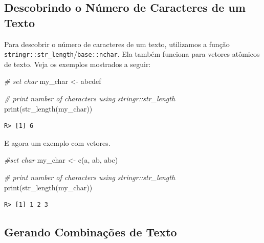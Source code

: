 \documentclass[
  11pt,
]{book}
\newenvironment{Shaded}{\begin{snugshade}}{\end{snugshade}}
\newcommand{\CommentTok}[1]{\textcolor[rgb]{0.37,0.37,0.37}{\textit{#1}}}
\newcommand{\FunctionTok}[1]{\textcolor[rgb]{0,0,0}{#1}}
\newcommand{\NormalTok}[1]{#1}
\newcommand{\OtherTok}[1]{\textcolor[rgb]{0.37,0.37,0.37}{#1}}
\newcommand{\StringTok}[1]{\textcolor[rgb]{0.5,0.5,0.5}{#1}}
\begin{document}
\hypertarget{descobrindo-o-nuxfamero-de-caracteres-de-um-texto}{%
\subsection{Descobrindo o Número de Caracteres de um Texto}\label{descobrindo-o-nuxfamero-de-caracteres-de-um-texto}}

Para descobrir o número de caracteres de um texto, utilizamos a função \texttt{stringr::str\_length}/\texttt{base::nchar}. Ela também funciona para vetores atômicos de texto. Veja os exemplos mostrados a seguir: 

\begin{Shaded}
\begin{Highlighting}[]
\CommentTok{\# set char}
\NormalTok{my\_char }\OtherTok{\textless{}{-}} \StringTok{\textquotesingle{}abcdef\textquotesingle{}}

\CommentTok{\# print number of characters using stringr::str\_length}
\FunctionTok{print}\NormalTok{(}\FunctionTok{str\_length}\NormalTok{(my\_char))}
\end{Highlighting}
\end{Shaded}

\begin{verbatim}
R> [1] 6
\end{verbatim}

E agora um exemplo com vetores.

\begin{Shaded}
\begin{Highlighting}[]
\CommentTok{\#set char}
\NormalTok{my\_char }\OtherTok{\textless{}{-}} \FunctionTok{c}\NormalTok{(}\StringTok{\textquotesingle{}a\textquotesingle{}}\NormalTok{, }\StringTok{\textquotesingle{}ab\textquotesingle{}}\NormalTok{, }\StringTok{\textquotesingle{}abc\textquotesingle{}}\NormalTok{)}

\CommentTok{\# print number of characters using stringr::str\_length}
\FunctionTok{print}\NormalTok{(}\FunctionTok{str\_length}\NormalTok{(my\_char))}
\end{Highlighting}
\end{Shaded}

\begin{verbatim}
R> [1] 1 2 3
\end{verbatim}

\hypertarget{gerando-combinauxe7uxf5es-de-texto}{%
\subsection{Gerando Combinações de Texto}\label{gerando-combinauxe7uxf5es-de-texto}}
\end{document}
